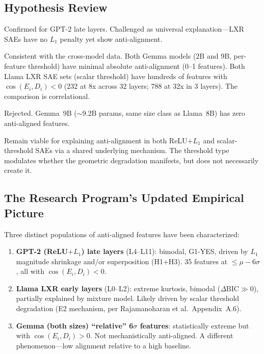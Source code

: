 \documentclass[11pt,a4paper]{article}
\newcommand{\cosED}{\cos(E_i, D_i)}
\begin{document}
\subsection{Hypothesis Review}

\begin{description}[leftmargin=1em]
  \item[H1 (Subtractive Hedges, $L_1$-specific):] Confirmed for GPT-2 late layers. Challenged as universal explanation---LXR SAEs have no $L_1$ penalty yet show anti-alignment.

  \item[E2 (Per-feature threshold):] Consistent with the cross-model data. Both Gemma models (2B and 9B, per-feature threshold) have minimal absolute anti-alignment (0--1 features). Both Llama LXR SAE sets (scalar threshold) have hundreds of features with $\cosED<0$ (232 at 8x across 32 layers; 788 at 32x in 3 layers). The comparison is correlational.

  \item[H6 (Size):] Rejected. Gemma~9B ($\sim$9.2B params, same size class as Llama~8B) has zero anti-aligned features.

  \item[H3/H5 (Superposition interference/compositional):] Remain viable for explaining anti-alignment in both ReLU$+L_1$ and scalar-threshold SAEs via a shared underlying mechanism. The threshold type modulates whether the geometric degradation manifests, but does not necessarily create it.
\end{description}

\subsection{The Research Program's Updated Empirical Picture}

Three distinct populations of anti-aligned features have been characterized:
\begin{enumerate}
  \item \textbf{GPT-2 (ReLU$+L_1$) late layers} (L4--L11): bimodal, G1-YES, driven by $L_1$ magnitude shrinkage and/or superposition (H1+H3). 35 features at $\leq\mu{-}6\sigma$, all with $\cosED < 0$.
  \item \textbf{Llama LXR early layers} (L0--L2): extreme kurtosis, bimodal ($\Delta\text{BIC} \gg 0$), partially explained by mixture model. Likely driven by scalar threshold degradation (E2 mechanism, per Rajamanoharan et al.\ Appendix~A.6).
  \item \textbf{Gemma (both sizes) ``relative'' 6$\sigma$ features}: statistically extreme but with $\cosED > 0$. Not mechanistically anti-aligned. A different phenomenon---low alignment relative to a high baseline.
\end{enumerate}
\end{document}

